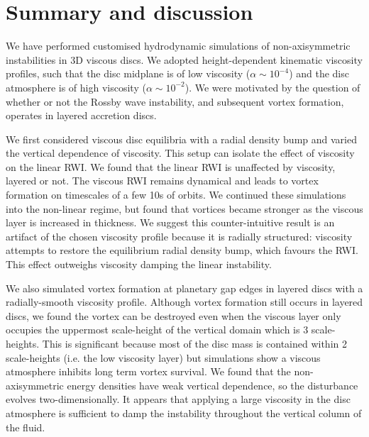 \section{Summary and discussion}\label{summary}
We have performed customised hydrodynamic simulations of
non-axisymmetric instabilities in 3D viscous discs. We adopted
height-dependent kinematic viscosity profiles, such that the disc
midplane is of low viscosity ($\alpha\sim 10^{-4}$) and the disc
atmosphere is of high viscosity ($\alpha\sim 10^{-2}$). We were motivated  
by the question of whether or not the Rossby wave instability, and
subsequent vortex formation, operates in layered accretion discs.  

We first considered viscous disc equilibria with a radial density
bump and varied the vertical dependence of viscosity. 
This setup can isolate the effect of viscosity on the
linear RWI. We found that the linear RWI is unaffected by viscosity,
layered or not. The viscous RWI remains dynamical and leads to vortex
formation on timescales of a few 10s of orbits. We continued these
simulations into the non-linear regime, but found that vortices became
stronger as the viscous layer is increased in thickness. We suggest this
counter-intuitive result is an artifact of the chosen viscosity
profile because it is radially structured: viscosity attempts to
restore the equilibrium radial density bump, which favours the
RWI. This effect outweighs viscosity damping the linear instability. 

We also simulated vortex formation at planetary gap edges in layered
discs with a radially-smooth viscosity profile. %
Although vortex formation still 
occurs in layered discs, we found the vortex can be destroyed even when the viscous
layer only occupies the uppermost scale-height of the vertical domain
which is 3 scale-heights. This is significant because most of the disc
mass is contained within 2 scale-heights (i.e. the low viscosity
layer) but simulations show a viscous atmosphere inhibits long term
vortex survival.    
We found that the non-axisymmetric energy densities have
weak vertical dependence, so the disturbance evolves
two-dimensionally. It appears that applying a large viscosity in the
disc atmosphere is sufficient to damp the instability throughout the
vertical column of the fluid.

